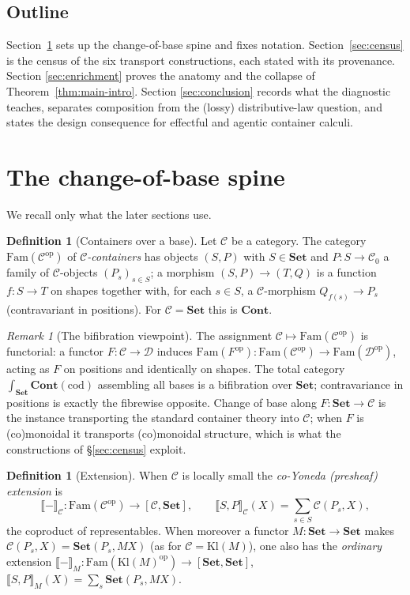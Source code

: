 \documentclass[11pt]{amsart}
\theoremstyle{plain}
\theoremstyle{definition}
\newtheorem{definition}[theorem]{Definition}
\theoremstyle{remark}
\newtheorem{remark}[theorem]{Remark}
\newcommand{\Set}{\mathbf{Set}}
\newcommand{\Cont}{\mathbf{Cont}}
\newcommand{\Fam}{\mathrm{Fam}}
\newcommand{\Kl}{\mathrm{Kl}}
\newcommand{\op}{\mathrm{op}}
\newcommand{\extM}[1]{\llbracket #1 \rrbracket_{M}}
\newcommand{\extC}[1]{\llbracket #1 \rrbracket_{\C}}
\newcommand{\C}{\mathcal{C}}
\newcommand{\D}{\mathcal{D}}
\begin{document}
\subsection*{Outline}
Section~\ref{sec:spine} sets up the change-of-base spine and fixes notation. Section~\ref{sec:census}
is the census of the six transport constructions, each stated with its provenance. Section
\ref{sec:enrichment} proves the anatomy and the collapse of Theorem~\ref{thm:main-intro}. Section
\ref{sec:conclusion} records what the diagnostic teaches, separates composition from the (lossy)
distributive-law question, and states the design consequence for effectful and agentic container
calculi.

\section{The change-of-base spine}\label{sec:spine}

We recall only what the later sections use.

\begin{definition}[Containers over a base]
Let $\C$ be a category. The category $\Fam(\C^{\op})$ of \emph{$\C$-containers} has objects
$(S,P)$ with $S\in\Set$ and $P\colon S\to\C_0$ a family of $\C$-objects $(P_s)_{s\in S}$; a morphism
$(S,P)\to(T,Q)$ is a function $f\colon S\to T$ on shapes together with, for each $s\in S$, a
$\C$-morphism $Q_{f(s)}\to P_s$ (contravariant in positions). For $\C=\Set$ this is $\Cont$.
\end{definition}

\begin{remark}[The bifibration viewpoint]\label{rmk:bifib}
The assignment $\C\mapsto\Fam(\C^{\op})$ is functorial: a functor $F\colon\C\to\D$ induces
$\Fam(F^{\op})\colon\Fam(\C^{\op})\to\Fam(\D^{\op})$, acting as $F$ on positions and identically on
shapes. The total category $\int_{\Set}\Cont(\mathrm{cod})$ assembling all bases is a bifibration over
$\Set$; contravariance in positions is exactly the fibrewise opposite. Change of base along
$F\colon\Set\to\C$ is the instance transporting the standard container theory into $\C$; when $F$ is
(co)monoidal it transports (co)monoidal structure, which is what the constructions of
\S\ref{sec:census} exploit.
\end{remark}

\begin{definition}[Extension]\label{def:extension}
When $\C$ is locally small the \emph{co-Yoneda (presheaf) extension} is
\[
  \extC{-}\colon \Fam(\C^{\op}) \longrightarrow [\C,\Set],\qquad
  \extC{S,P}(X) = \sum_{s\in S}\C(P_s, X),
\]
the coproduct of representables. When moreover a functor $M\colon\Set\to\Set$ makes
$\C(P_s,X)=\Set(P_s,MX)$ (as for $\C=\Kl(M)$), one also has the \emph{ordinary} extension
$\extM{-}\colon\Fam(\Kl(M)^{\op})\to[\Set,\Set]$, $\extM{S,P}(X)=\sum_s\Set(P_s,MX)$.
\end{definition}
\end{document}
